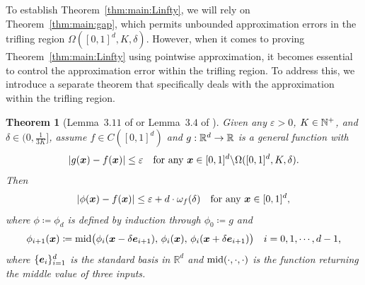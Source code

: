 \documentclass[nohyperref]{article}
\theoremstyle{plain}
\newtheorem{theorem}{Theorem}[section]
\theoremstyle{definition}
\theoremstyle{remark}
\begin{document}



To establish Theorem~\ref{thm:main:Linfty}, we will rely on Theorem~\ref{thm:main:gap}, which permits unbounded approximation errors in the trifling region $\Omega([0,1]^d,K,\delta)$. However, when it comes to proving Theorem~\ref{thm:main:Linfty} using pointwise approximation, it becomes essential to control the approximation error within the trifling region. To address this, we introduce a separate theorem that specifically deals with the approximation within the trifling region.

\begin{theorem}[Lemma~$3.11$ of \cite{shijun:thesis} or Lemma~$3.4$ of \cite{shijun:3}]
	\label{thm:gap:handling}
	Given any $\varepsilon>0$, $K\in \N^+$, and $\delta\in (0, \tfrac{1}{3K}]$,
	assume $f\in C([0,1]^d)$ and $g:\R^d\to \R$ is a general function with
	\begin{equation*}
		|g({\bm{x}})-f({\bm{x}})|\le \varepsilon\quad \textnormal{for any ${\bm{x}}\in [0,1]^d\backslash \Omega([0,1]^d,K,\delta)$.}
	\end{equation*}
	Then
	\begin{equation*}
		|\phi({\bm{x}})-f({\bm{x}})|\le \varepsilon+d\cdot\omega_f(\delta)\quad \textnormal{for any ${\bm{x}}\in [0,1]^d$,}
	\end{equation*}
	where $\phi\coloneqq  \phi_d$ is defined by induction through $\phi_0\coloneqq g$ and
	\begin{equation*}
		\phi_{i+1}(\bmx)\coloneqq  \middleValue\big(\phi_{i}(\bmx-\delta\bme_{i+1}),\, \phi_{i}(\bmx),\,\phi_{i}(\bmx+\delta\bme_{i+1})\big)\quad \tn{$i=0,1,\dotsc,d-1$,}
	\end{equation*}
	where $\{{\bm{e}}_i\}_{i=1}^d$ is the standard basis in $\mathbb{R}^d$ and ${\textnormal{mid}}(\cdot,\cdot,\cdot)$ is the function returning the middle value of three inputs. 	 
\end{theorem}
\end{document}
